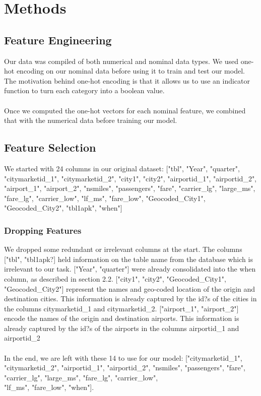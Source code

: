 \documentclass{article}
\begin{document}
\section{Methods}

\subsection{Feature Engineering}

Our data was compiled of both numerical and nominal data types. We used one-hot encoding on our nominal data before using it to train and test our model. The motivation behind one-hot encoding is that it allows us to use an indicator function to turn each category into a boolean value. \\\\
Once we computed the one-hot vectors for each nominal feature, we combined that with the numerical data before training our model. 
\subsection{Feature Selection}
We started with 24 columns in our original dataset:
["tbl", "Year", "quarter", "citymarketid\_1", "citymarketid\_2", "city1", "city2", 
"airportid\_1", "airportid\_2", "airport\_1", "airport\_2", "nsmiles", "passengers", 
"fare", "carrier\_lg", "large\_ms", "fare\_lg", "carrier\_low", "lf\_ms", "fare\_low",
"Geocoded\_City1", 
\\"Geocoded\_City2", "tbl1apk", "when"]
\subsubsection{Dropping Features}
We dropped some redundant or irrelevant columns at the start. The columns ["tbl", "tbl1apk?] held information on the table name from the database which is irrelevant to our task. ["Year", "quarter"] were already consolidated into the when column, as described in section 2.2. ["city1", "city2", "Geocoded\_City1", "Geocoded\_City2"] represent the names and geo-coded location of the origin and destination cities. This information is already captured by the id?s of the cities in the columns citymarketid\_1 and citymarketid\_2. ["airport\_1", "airport\_2"] encode the names of the origin and destination airports. This information is already captured by the id?s of the airports in the columns airportid\_1 and airportid\_2
\\\\
In the end, we are left with these 14 to use for our model: ["citymarketid\_1", "citymarketid\_2", "airportid\_1", "airportid\_2", "nsmiles", "passengers", "fare", "carrier\_lg", "large\_ms", "fare\_lg", "carrier\_low", 
\\"lf\_ms", "fare\_low", "when"].
\end{document}
